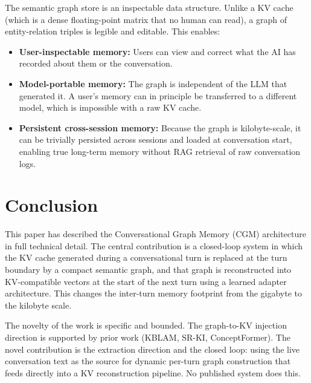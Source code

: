\documentclass[11pt, a4paper, twoside]{article}
\theoremstyle{definition}
\newcommand{\CGM}{\textsc{CGM}\xspace}
\begin{document}
The semantic graph store is an inspectable data structure. Unlike a KV cache
(which is a dense floating-point matrix that no human can read), a graph of
entity-relation triples is legible and editable. This enables:

\begin{itemize}[leftmargin=*]
  \item \textbf{User-inspectable memory:} Users can view and correct what the
    AI has recorded about them or the conversation.
  \item \textbf{Model-portable memory:} The graph is independent of the LLM that
    generated it. A user's memory can in principle be transferred to a different
    model, which is impossible with a raw KV cache.
  \item \textbf{Persistent cross-session memory:} Because the graph is
    kilobyte-scale, it can be trivially persisted across sessions and loaded
    at conversation start, enabling true long-term memory without RAG retrieval
    of raw conversation logs.
\end{itemize}

\section{Conclusion}
\label{sec:conclusion}

This paper has described the Conversational Graph Memory (\CGM) architecture in
full technical detail. The central contribution is a closed-loop system in which
the KV cache generated during a conversational turn is replaced at the turn
boundary by a compact semantic graph, and that graph is reconstructed into
KV-compatible vectors at the start of the next turn using a learned adapter
architecture. This changes the inter-turn memory footprint from the gigabyte
to the kilobyte scale.

\medskip

The novelty of the work is specific and bounded. The graph-to-KV injection
direction is supported by prior work (KBLAM, SR-KI, ConceptFormer). The novel
contribution is the extraction direction and the closed loop: using the live
conversation text as the source for dynamic per-turn graph construction that
feeds directly into a KV reconstruction pipeline. No published system does this.

\medskip
\end{document}
